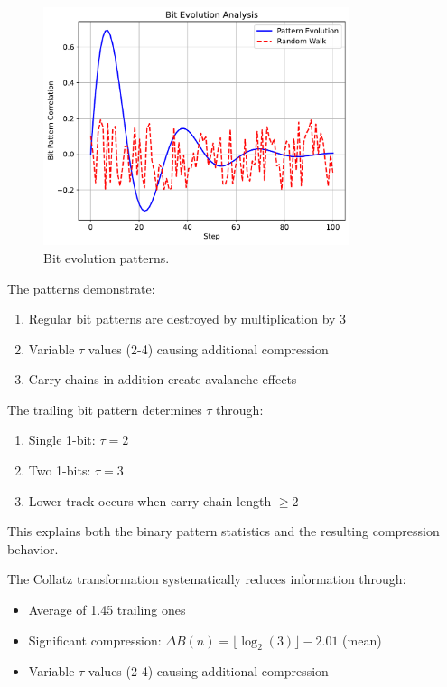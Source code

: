 \begin{figure}[h]
\centering
\includegraphics[width=0.8\textwidth]{figures/bit_evolution.pdf}
\caption{Bit evolution patterns.}
\label{fig:bit_evolution}
\end{figure}

The patterns demonstrate:
\begin{enumerate}
\item Regular bit patterns are destroyed by multiplication by 3
\item Variable $\tau$ values (2-4) causing additional compression
\item Carry chains in addition create avalanche effects
\end{enumerate}

The trailing bit pattern determines $\tau$ through:
\begin{enumerate}
\item Single 1-bit: $\tau = 2$
\item Two 1-bits: $\tau = 3$
\item Lower track occurs when carry chain length $\geq 2$
\end{enumerate}

This explains both the binary pattern statistics and the resulting compression behavior.

\begin{theorem}
\label{thm:entropy}
The Collatz transformation systematically reduces information through:
\begin{itemize}
\item Average of 1.45 trailing ones
\item Significant compression: $\Delta B(n) = \lfloor \log_2(3) \rfloor - 2.01$ (mean)
\item Variable $\tau$ values (2-4) causing additional compression
\end{itemize}
\end{theorem}

